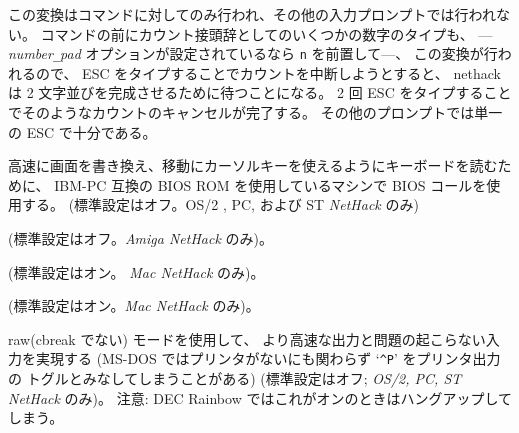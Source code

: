 この変換はコマンドに対してのみ行われ、その他の入力プロンプトでは行われない。
コマンドの前にカウント接頭辞としてのいくつかの数字のタイプも、
---
{\it number\verb+_+pad\/}
オプションが設定されているなら {\tt n} を前置して---、
この変換が行われるので、
ESC をタイプすることでカウントを中断しようとすると、
nethack は 2 文字並びを完成させるために待つことになる。
2 回 ESC をタイプすることでそのようなカウントのキャンセルが完了する。
その他のプロンプトでは単一の ESC で十分である。
\item[\ib{BIOS}]
高速に画面を書き換え、移動にカーソルキーを使えるようにキーボードを読むために、
IBM-PC 互換の BIOS ROM を使用しているマシンで BIOS コールを使用する。
(標準設定はオフ。OS/2 , PC, および ST {\it NetHack\/} のみ)
\item[\ib{flush}]
(標準設定はオフ。{\it Amiga NetHack \/} のみ)。
\item[\ib{Macgraphics}]
(標準設定はオン。 {\it Mac NetHack \/} のみ)。
\item[\ib{page\verb+_+wait}]
(標準設定はオン。{\it Mac NetHack \/} のみ)。
\item[\ib{rawio}]
raw(cbreak でない) モードを使用して、
より高速な出力と問題の起こらない入力を実現する
(MS-DOS ではプリンタがないにも関わらず `{\tt \^{}P}' をプリンタ出力の
トグルとみなしてしまうことがある)
(標準設定はオフ; {\it OS/2, PC, ST NetHack\/} のみ)。
注意: DEC Rainbow ではこれがオンのときはハングアップしてしまう。
